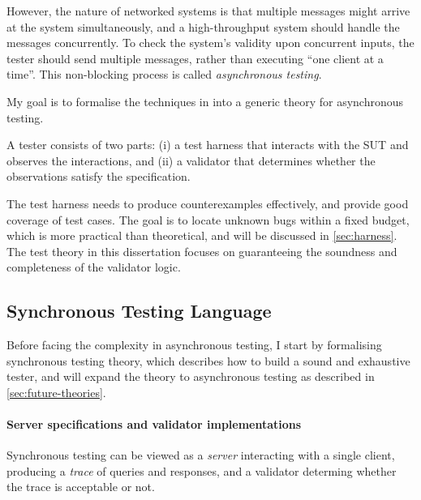 \documentclass{article}
\theoremstyle{definition}
\begin{document}
However, the nature of networked systems is that multiple messages might arrive
at the system simultaneously, and a high-throughput system should handle the
messages concurrently.  To check the system's validity upon concurrent inputs,
the tester should send multiple messages, rather than executing ``one client at
a time''.  This non-blocking process is called {\em asynchronous testing}.

My goal is to formalise the techniques in \textcite{issta21} into a generic
theory for asynchronous testing.

A tester consists of two parts: (i) a test harness that interacts with the SUT
and observes the interactions, and (ii) a validator that determines whether the
observations satisfy the specification.

The test harness needs to produce counterexamples effectively, and provide good
coverage of test cases.  The goal is to locate unknown bugs within a fixed
budget, which is more practical than theoretical, and will be discussed in
\autoref{sec:harness}.  The test theory in this dissertation focuses on
guaranteeing the soundness and completeness of the validator logic.

\subsection{Synchronous Testing Language}
Before facing the complexity in asynchronous testing, I start by formalising
synchronous testing theory, which describes how to build a sound and exhaustive
tester, and will expand the theory to asynchronous testing as described in
\autoref{sec:future-theories}.

\paragraph{Server specifications and validator implementations}
Synchronous testing can be viewed as a {\em server} interacting with a single
client, producing a {\em trace} of queries and responses, and a validator
determing whether the trace is acceptable or not.
\end{document}
